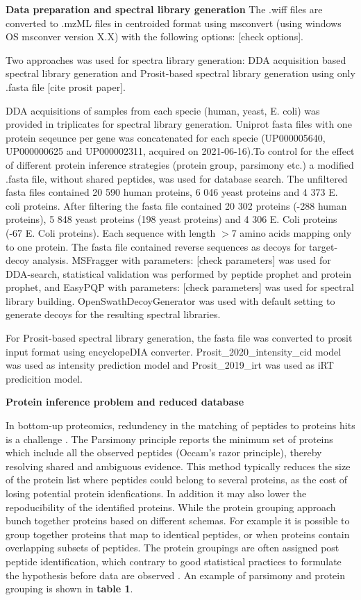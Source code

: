 \documentclass[10pt,letterpaper]{article}
\begin{document}
\textbf{Data preparation and spectral library generation}
The .wiff files are converted to .mzML files in centroided format using msconvert (using windows OS msconver version X.X) with the following options: [check options]. 

Two approaches was used for spectra library generation: DDA acquisition based spectral library generation and Prosit-based spectral library generation using only .fasta file [cite prosit paper]. 

DDA acquisitions of samples from each specie (human, yeast, E. coli) was provided in triplicates for spectral library generation. Uniprot fasta files with one protein seqeunce per gene was concatenated for each specie (UP000005640, UP000000625 and UP000002311, acquired on 2021-06-16).To control for the effect of different protein inference strategies (protein group, parsimony etc.) a modified .fasta file, without shared peptides, was used for database search. The unfiltered fasta files contained 20 590 human proteins, 6 046 yeast proteins and 4 373 E. coli proteins. After filtering the fasta file contained 20 302 proteins (-288 human proteins), 5 848 yeast proteins (198 yeast proteins) and 4 306 E. Coli proteins (-67 E. Coli proteins). Each sequence with length $>$7 amino acids mapping only to one protein. The fasta file contained reverse sequences as decoys for target-decoy analysis. MSFragger with parameters: [check parameters] was used for DDA-search, statistical validation was performed by peptide prophet and protein prophet, and EasyPQP with parameters: [check parameters] was used for spectral library building. OpenSwathDecoyGenerator was used with default setting to generate decoys for the resulting spectral libraries.  

For Prosit-based spectral library generation, the fasta file was converted to prosit input format using encyclopeDIA converter. Prosit\_2020\_intensity\_cid model was used as intensity prediction model and Prosit\_2019\_irt was used as iRT predicition model.  


\textbf{Protein inference problem and reduced database}

In bottom-up proteomics, redundency in the matching of peptides to proteins hits is a challenge \cite{nesvizhskii2005interpretation}. The Parsimony principle reports the minimum set of proteins which include all the observed peptides (Occam's razor principle), thereby resolving shared and ambiguous evidence. This method typically reduces the size of the protein list where peptides could belong to several proteins, as the cost of losing potential protein idenfications. In addition it may also lower the repoducibility of the identified proteins\cite{serang2012recognizing}. While the protein grouping approach bunch together proteins based on different schemas. For example it is possible to group together proteins that map to identical peptides, or when proteins contain overlapping subsets of peptides. The protein groupings are often assigned post peptide identification, which contrary to good statistical practices to formulate the hypothesis before data are observed \cite{serang2012recognizing}. An example of parsimony and protein grouping is shown in \textbf{table 1}. 
\end{document}
